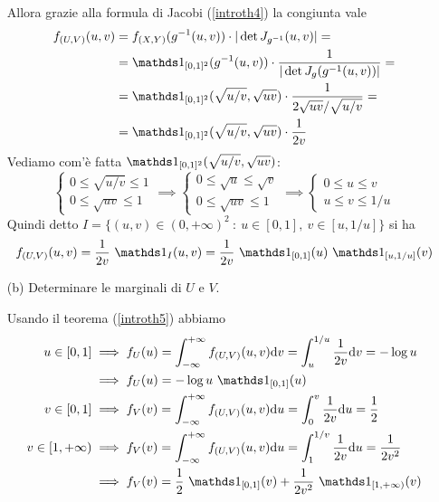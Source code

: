 \begin{enumerate}
Allora grazie alla formula di Jacobi (\ref{introth4}) la congiunta vale
\begin{gather*}
\begin{aligned}
f_{(U,V)}(u,v)&=\fXY(g^{-1}(u,v))\cdot |\det J_{g^{-1}}(u,v)|=\\
&=\Ind_{[0,1]^2}(g^{-1}(u,v))\cdot\frac{1}{|\det J_g(g^{-1}(u,v))|}=\\
&=\Ind_{[0,1]^2}(\sqrt{u/v},\sqrt{uv})\cdot\frac{1}{2\sqrt{uv}/\sqrt{u/v}}=\\
&=\Ind_{[0,1]^2}(\sqrt{u/v},\sqrt{uv})\cdot\frac{1}{2v}
\end{aligned}
\end{gather*}
Vediamo com'è fatta $\Ind_{[0,1]^2}(\sqrt{u/v},\sqrt{uv})$:
\[
\begin{cases}0\leq\sqrt{u/v}\leq 1  \\ 0\leq \sqrt{uv}\leq 1 \end{cases}
\implies
\begin{cases}0\leq\sqrt{u}\leq \sqrt{v}  \\ 0\leq \sqrt{uv}\leq 1 \end{cases}
\implies
\begin{cases}0\leq u\leq v  \\ u\leq v\leq 1/u \end{cases}
\]
Quindi detto $I=\{(u,v)\in(0,+\infty)^2\ :\ u\in[0,1],\ v\in[u,1/u]  \}$ si ha
\[
f_{(U,V)}(u,v)=\frac{1}{2v}\ \Ind_I(u,v)=\frac{1}{2v}\ \Ind_{[0,1]}(u)\ \Ind_{[u,1/u]}(v)
\]

\item [(b)] Determinare le marginali di $U$ e $V$.

Usando il teorema (\ref{introth5}) abbiamo
\begin{gather*}
\begin{aligned}
u\in[0,1]&\implies f_{U}(u)=\intb f_{(U,V)}(u,v)\dv=\int_u^{1/u}\frac{1}{2v}\dv=-\log u \\
&\implies  f_{U}(u)=-\log u \ \Ind_{[0,1]}(u) \\
v\in[0,1]&\implies f_V(v)=\intb f_{(U,V)}(u,v)\du=\int_0^v \frac{1}{2v}\du=\frac{1}{2} \\
v\in[1,+\infty)&\implies f_V(v)=\intb f_{(U,V)}(u,v)\du=\int_1^{1/v} \frac{1}{2v}\du=\frac{1}{2v^2} \\
&\implies f_V(v)=\frac{1}{2}\ \Ind_{[0,1]}(v)+\frac{1}{2v^2}\ \Ind_{[1,+\infty)}(v)
\end{aligned}
\end{gather*}

\end{enumerate}


